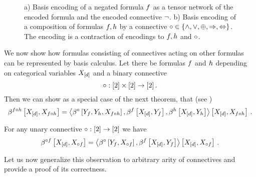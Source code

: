 \begin{figure}[h]
\begin{center}
	
\end{center}
\caption{a) Basis encoding of a negated formula $f$ as a tensor network of the encoded formula and the encoded connective $\lnot$.
	b) Basis encoding of a composition of formulas $f, h$ by a connective $\circ\in\{\land,\lor,\oplus,\Rightarrow,\Leftrightarrow\}$.
	The encoding is a contraction of encodings to  $f, h$ and $\circ$.}
	\label{fig:unaryBinaryComposition} 
\end{figure}

We now show how formulas consisting of connectives acting on other formulas can be represented by basis calculus.
Let there be formulas $f$ and $h$ depending on categorical variables $X_{[d]}$ and a binary connective
	\[ \circ: [2]\times[2] \rightarrow[2] \, . \]
Then we can show as a special case of the next theorem, that (see )
\begin{align*}
	\beta^{f\circ h}\left[X_{[d]},X_{f\circ h}\right]
	= \left\langle 
	\beta^{\circ}\left[Y_{f},Y_{h},X_{f\circ h}\right],
	\beta^{f}\left[X_{[d]},Y_{f}\right],
	\beta^{h}\left[X_{[d]},Y_{h}\right] 
	\right\rangle \left[ 
	X_{[d]},X_{f\circ h}
	 \right] \, . 
\end{align*}

For any unary connective $\circ: [2] \rightarrow[2]$ we have
\begin{align*}
	\beta^{\circ f}\left[X_{[d]},X_{\circ f}\right]
	= \left\langle 
	\beta^{\circ}\left[Y_{f},X_{\circ f}\right],
	\beta^{f}\left[X_{[d]},Y_{f}\right]
	\right\rangle \left[ 
	X_{[d]},X_{\circ f} \right] \, . 
\end{align*}

Let us now generalize this observation to arbitrary arity of connectives and provide a proof of its correctness.

